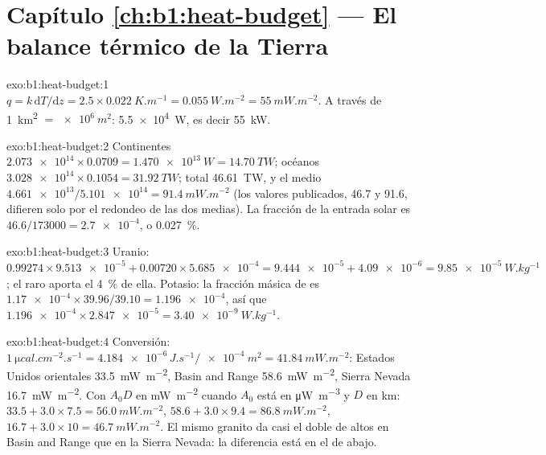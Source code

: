 \section*{Capítulo \ref{ch:b1:heat-budget} --- El balance térmico de la Tierra}

\begin{solution}{exo:b1:heat-budget:1}
$q = k\,\mathrm dT/\mathrm dz = 2.5\times\qty{0.022}{K.m^{-1}} =
\qty{0.055}{W.m^{-2}} = \qty{55}{mW.m^{-2}}$. A través de \qty{1}{km^2} $=
\qty{e6}{m^2}$: \qty{5.5e4}{W}, es decir \qty{55}{kW}.
\end{solution}

\begin{solution}{exo:b1:heat-budget:2}
Continentes $\num{2.073e14}\times0.0709 = \qty{1.470e13}{W} = \qty{14.70}{TW}$;
océanos $\num{3.028e14}\times0.1054 = \qty{31.92}{TW}$; total \qty{46.61}{TW}, y
el  medio $\num{4.661e13}/\num{5.101e14} = \qty{91.4}{mW.m^{-2}}$ (los
valores publicados, 46.7 y 91.6, difieren solo por el redondeo de las dos medias). La
fracción de la entrada solar es $46.6/173000 = \num{2.7e-4}$, o
\qty{0.027}{\percent}.
\end{solution}

\begin{solution}{exo:b1:heat-budget:3}
Uranio: $0.99274\times\num{9.513e-5} + 0.00720\times\num{5.685e-4} =
\num{9.444e-5} + \num{4.09e-6} = \qty{9.85e-5}{W.kg^{-1}}$; el raro
 aporta el \qty{4}{\percent} de ella. Potasio: la fracción másica de
 es $\num{1.17e-4}\times39.96/39.10 = \num{1.196e-4}$, así que
$\num{1.196e-4}\times\num{2.847e-5} = \qty{3.40e-9}{W.kg^{-1}}$.
\end{solution}

\begin{solution}{exo:b1:heat-budget:4}
Conversión: $\qty{1}{\micro cal.cm^{-2}.s^{-1}} = \num{4.184e-6}\,\unit{J.s^{-1}}/\qty{e-4}{m^2}
= \qty{41.84}{mW.m^{-2}}$: Estados Unidos orientales \qty{33.5}{mW.m^{-2}}, Basin and
Range \qty{58.6}{mW.m^{-2}}, Sierra Nevada \qty{16.7}{mW.m^{-2}}. Con $A_0D$ en
\unit{mW.m^{-2}} cuando $A_0$ está en \unit{\micro W.m^{-3}} y $D$ en \unit{km}:
$33.5 + 3.0\times7.5 = \qty{56.0}{mW.m^{-2}}$, $58.6 + 3.0\times9.4 =
\qty{86.8}{mW.m^{-2}}$, $16.7 + 3.0\times10 = \qty{46.7}{mW.m^{-2}}$. El mismo
granito da  casi el doble de altos en Basin and Range que en la
Sierra Nevada: la diferencia está en el  de abajo.
\end{solution}


